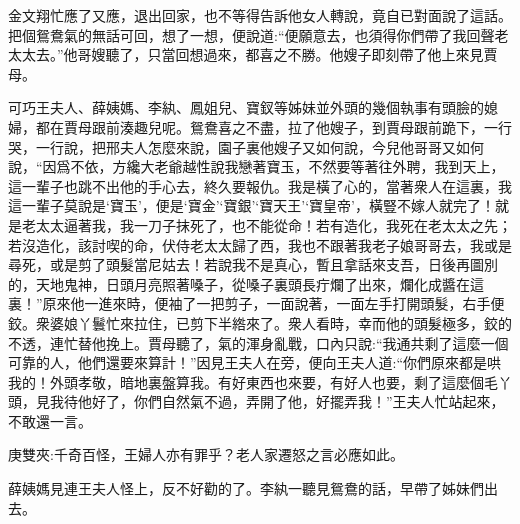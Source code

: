 \begin{parag}
    金文翔忙應了又應，退出回家，也不等得告訴他女人轉說，竟自已對面說了這話。把個鴛鴦氣的無話可回，想了一想，便說道:“便願意去，也須得你們帶了我回聲老太太去。”他哥嫂聽了，只當回想過來，都喜之不勝。他嫂子即刻帶了他上來見賈母。
\end{parag}


\begin{parag}
    可巧王夫人、薛姨媽、李紈、鳳姐兒、寶釵等姊妹並外頭的幾個執事有頭臉的媳婦，都在賈母跟前湊趣兒呢。鴛鴦喜之不盡，拉了他嫂子，到賈母跟前跪下，一行哭，一行說，把邢夫人怎麼來說，園子裏他嫂子又如何說，今兒他哥哥又如何說，“因爲不依，方纔大老爺越性說我戀著寶玉，不然要等著往外聘，我到天上，這一輩子也跳不出他的手心去，終久要報仇。我是橫了心的，當著衆人在這裏，我這一輩子莫說是‘寶玉’，便是‘寶金’‘寶銀’‘寶天王’‘寶皇帝’，橫豎不嫁人就完了！就是老太太逼著我，我一刀子抹死了，也不能從命！若有造化，我死在老太太之先；若沒造化，該討喫的命，伏侍老太太歸了西，我也不跟著我老子娘哥哥去，我或是尋死，或是剪了頭髮當尼姑去！若說我不是真心，暫且拿話來支吾，日後再圖別的，天地鬼神，日頭月亮照著嗓子，從嗓子裏頭長疔爛了出來，爛化成醬在這裏！”原來他一進來時，便袖了一把剪子，一面說著，一面左手打開頭髮，右手便鉸。衆婆娘丫鬟忙來拉住，已剪下半綹來了。衆人看時，幸而他的頭髮極多，鉸的不透，連忙替他挽上。賈母聽了，氣的渾身亂戰，口內只說:“我通共剩了這麼一個可靠的人，他們還要來算計！”因見王夫人在旁，便向王夫人道:“你們原來都是哄我的！外頭孝敬，暗地裏盤算我。有好東西也來要，有好人也要，剩了這麼個毛丫頭，見我待他好了，你們自然氣不過，弄開了他，好擺弄我！”王夫人忙站起來，不敢還一言。\begin{note}庚雙夾:千奇百怪，王婦人亦有罪乎？老人家遷怒之言必應如此。\end{note}薛姨媽見連王夫人怪上，反不好勸的了。李紈一聽見鴛鴦的話，早帶了姊妹們出去。
\end{parag}


